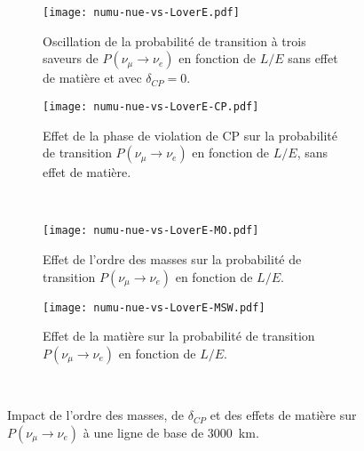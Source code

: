       \begin{figure}[htpb]
        \centering
        \begin{subfigure}[t]{0.49\textwidth}
          \centering
          \texttt{[image: numu-nue-vs-LoverE.pdf]}
          \caption{\label{fig::3flav_oscillation_vanilla}Oscillation de la probabilité de transition à trois saveurs de $P(\nu_{\mu}\to\nu_e)$ en fonction de $L/E$ sans effet de matière et avec $\delta_{CP}=0$.}
        \end{subfigure}\hfill
        \begin{subfigure}[t]{0.49\textwidth}
          \centering
          \texttt{[image: numu-nue-vs-LoverE-CP.pdf]}
          \caption{\label{fig::3flav_oscillation_cp}Effet de la phase de violation de CP sur la probabilité de transition $P(\nu_{\mu}\to\nu_e)$ en fonction de $L/E$, sans effet de matière.}
        \end{subfigure}\\
        \begin{subfigure}[t]{0.49\textwidth}
          \centering
          \texttt{[image: numu-nue-vs-LoverE-MO.pdf]}
          \caption{\label{fig::3flav_oscillation_ordering}Effet de l'ordre des masses sur la probabilité de transition $P(\nu_{\mu}\to\nu_e)$ en fonction de $L/E$.}
        \end{subfigure}\hfill
        \begin{subfigure}[t]{0.49\textwidth}
          \centering
          \texttt{[image: numu-nue-vs-LoverE-MSW.pdf]}
          \caption{\label{fig::3flav_oscillation_matter}Effet de la matière sur la probabilité de transition $P(\nu_{\mu}\to\nu_e)$ en fonction de $L/E$.}
        \end{subfigure}\\
        \caption[Impact de l'ordre des masses, de $\delta_{CP}$ et des effets de matière sur $P(\nu_{\mu}\to\nu_e)$]{\label{fig::3flav_oscillation}Impact de l'ordre des masses, de $\delta_{CP}$ et des effets de matière sur $P(\nu_{\mu}\to\nu_e)$ à une ligne de base de \SI{3000}{\kilo\meter}.}
      \end{figure}

